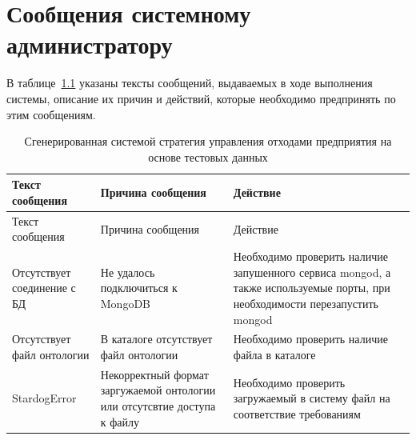 \documentclass[a4paper]{G2-105}
\begin{document}
\chapter{Сообщения системному администратору}

В таблице~\ref{tab:messages} указаны тексты сообщений, выдаваемых в ходе выполнения системы, описание их причин и действий, которые необходимо предпринять по этим сообщениям.

\begin{longtable}[l]{|p{4cm}|p{5.3cm}|p{5.3cm}|}
\caption{Сгенерированная системой стратегия управления отходами предприятия на основе тестовых данных}
\label{tab:messages}\tabularnewline
\hline
Текст сообщения & Причина сообщения & Действие \tabularnewline
\endfirsthead
\hline
Текст сообщения & Причина сообщения & Действие \tabularnewline
\endhead
\hline
Отсутствует соединение с БД & Не удалось подключиться к MongoDB & Необходимо проверить наличие запушенного сервиса mongod, а также используемые порты, при необходимости перезапустить mongod \tabularnewline
\hline
Отсутствует файл онтологии & В каталоге отсутствует файл онтологии & Необходимо
проверить наличие файла в каталоге \tabularnewline
\hline
StardogError & Некорректный формат заргужаемой онтологии или отсутсвтие доступа к файлу & Необходимо
проверить загружаемый в систему файл на соответствие требованиям \tabularnewline
\end{longtable}
\end{document}
